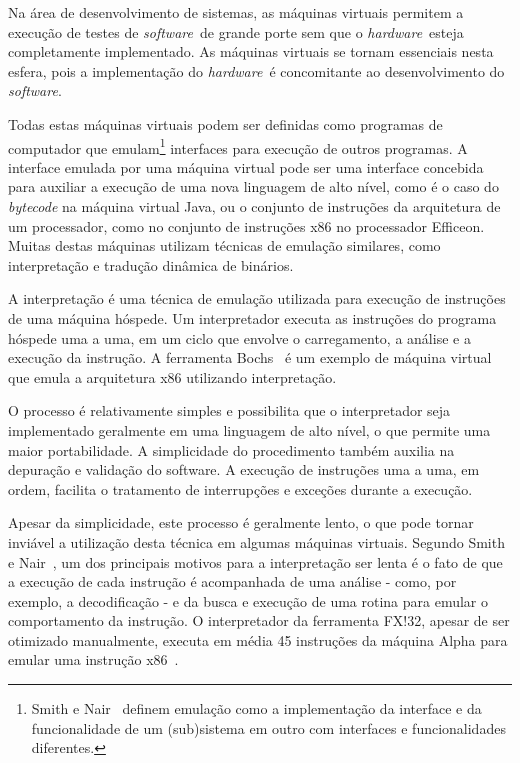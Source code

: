 \documentclass[a4paper,12pt]{article}
\newcommand{\software}{\emph{software}}
\newcommand{\hardware}{\emph{hardware}}
\begin{document}
Na área de desenvolvimento de sistemas, as máquinas virtuais permitem a execução
de testes de \software\ de grande porte sem que o \hardware\ esteja
completamente implementado. As máquinas virtuais se tornam essenciais nesta
esfera, pois a implementação do \hardware\ é concomitante ao desenvolvimento do
\software.

Todas estas máquinas virtuais podem ser definidas como programas de computador
que emulam\footnote{Smith e Nair~\cite{smith_nair_1} definem emulação como a
  implementação da interface e da funcionalidade de um (sub)sistema em outro com
  interfaces e funcionalidades diferentes.} interfaces para execução de outros
programas. A interface emulada por uma máquina virtual pode ser uma interface
concebida para auxiliar a execução de uma nova linguagem de alto nível, como é o
caso do \emph{bytecode} na máquina virtual Java, ou o conjunto de instruções da
arquitetura de um processador, como no conjunto de instruções x86 no processador
Efficeon. Muitas destas máquinas utilizam técnicas de emulação similares, como
interpretação e tradução dinâmica de binários.

A interpretação é uma técnica de emulação utilizada para execução de instruções
de uma máquina hóspede. Um interpretador executa as instruções do programa
hóspede uma a uma, em um ciclo que envolve o carregamento, a análise e a
execução da instrução. A ferramenta Bochs~\cite{boch} é um exemplo de máquina
virtual que emula a arquitetura x86 utilizando interpretação.

O processo é relativamente simples e possibilita que o interpretador seja
implementado geralmente em uma linguagem de alto nível, o que permite uma maior
portabilidade. A simplicidade do procedimento também auxilia na depuração e
validação do software. A execução de instruções uma a uma, em ordem, facilita o
tratamento de interrupções e exceções durante a execução.%

Apesar da simplicidade, este processo é geralmente lento, o que pode tornar
inviável a utilização desta técnica em algumas máquinas virtuais. Segundo Smith
e Nair~\cite{smith_nair_1}, um dos principais motivos para a interpretação ser
lenta é o fato de que a execução de cada instrução é acompanhada de uma análise
- como, por exemplo, a decodificação - e da busca e execução de uma rotina para
emular o comportamento da instrução. O interpretador da ferramenta FX!32, apesar
de ser otimizado manualmente, executa em média 45 instruções da máquina Alpha
para emular uma instrução x86~\cite{fx32}. 
\end{document}
